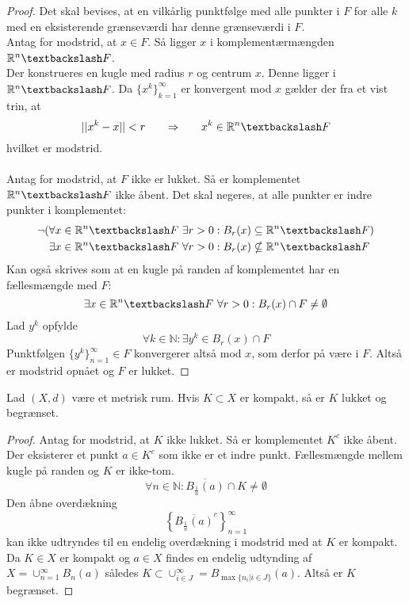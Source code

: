 \begin{proof}
Det skal bevises, at en vilkårlig punktfølge med alle punkter i $F$ for alle $k$ med en eksisterende grænseværdi har denne grænseværdi i $F$.\\
Antag for modstrid, at $x\in F$. Så ligger $x$ i komplementærmængden $\mathbb{R}^n\textbackslash F$.\\
Der konstrueres en kugle med radius $r$ og centrum $x$. Denne ligger i $\mathbb{R}^n\textbackslash F$. Da $\{x^k\}_{k=1}^\infty$ er konvergent mod $x$ gælder der fra et vist trin, at
\begin{equation}
||x^k-x||<r \phantom{mm}\Rightarrow\phantom{mm}x^k\in\mathbb{R}^n\textbackslash F
\end{equation}
hvilket er modstrid.\\\\
Antag for modstrid, at $F$ ikke er lukket. Så er komplementet $\mathbb{R}^n\textbackslash F$ ikke åbent. Det skal negeres, at alle punkter er indre punkter i komplementet:
\begin{align}
\neg(\forall x\in\mathbb{R}^n\textbackslash F\ \exists r>0&: B_r(x)\subseteq\mathbb{R}^n\textbackslash F)\\
\exists x \in \mathbb{R}^n\textbackslash F \ \forall r>0&: B_r(x)\nsubseteq\mathbb{R}^n\textbackslash F
\end{align}
Kan også skrives som at en kugle på randen af komplementet har en fællesmængde med $F$:
\begin{equation}
\exists x \in \mathbb{R}^n\textbackslash F \ \forall r>0: B_r(x)\cap F \neq \emptyset
\end{equation}
Lad $y^k$ opfylde
\begin{equation}
\forall k\in\mathbb{N}:\exists y^k\in B_r(x)\cap F
\end{equation}
Punktfølgen $\{y^k\}_{n=1}^\infty\in F$ konvergerer altså mod $x$, som derfor på være i $F$. Altså er modstrid opnået og $F$ er lukket.
\end{proof}
\begin{theorem}
Lad $(X,d)$ være et metrisk rum. Hvis $K\subset X$ er kompakt, så er $K$ lukket og begrænset.
\end{theorem}
\begin{proof}
Antag for modstrid, at $K$ ikke lukket. Så er komplementet $K^c$ ikke åbent.\\
Der eksisterer et punkt $a\in K^c$ som ikke er et indre punkt. Fællesmængde mellem kugle på randen og $K$ er ikke-tom.
\begin{equation}
\forall n\in\mathbb{N}:\overline{B_{\frac{1}{n}}(a)}\cap K\neq\emptyset
\end{equation}
Den åbne overdækning
\begin{equation}
\left\{\overline{B_{\frac{1}{n}}(a)}^c\right\}_{n=1}^\infty
\end{equation}
kan ikke udtryndes til en endelig overdækning i modstrid med at $K$ er kompakt.\\
Da $K\in X$ er kompakt og $a\in X$ findes en endelig udtynding af $X = \cup_{n=1}^\infty B_n(a)$ således $K\subset\cup_{i\in J}^\infty=B_{\max\{n_i|i\in J\}}(a)$. Altså er $K$ begrænset.
\end{proof}
\clearpage
